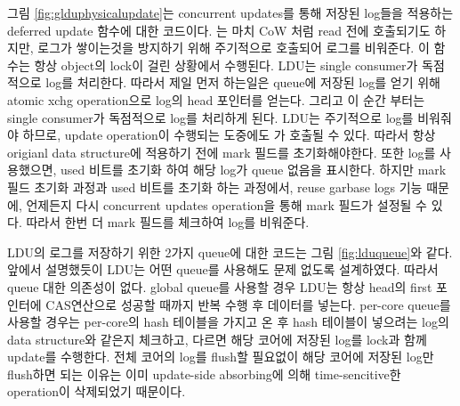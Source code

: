 \ifkor
그림 \ref{fig:glduphysicalupdate}는 concurrent updates를 통해 저장된 log들을 적용하는 deferred
update 함수에 대한 코드이다.
는 마치 CoW 처럼 read 전에 호출되기도 하지만, 로그가 쌓이는것을 방지하기 위해 주기적으로
호출되어 로그를 비워준다.
이 함수는 항상 object의 lock이 걸린 상황에서 수행된다. 
LDU는 single consumer가 독점적으로 log를 처리한다.
따라서 제일 먼저 하는일은 queue에 저장된 log를 얻기 위해 atomic xchg operation으로 log의 head 포인터를
얻는다.
그리고 이 순간 부터는 single consumer가 독점적으로 log를 처리하게 된다.
LDU는 주기적으로 log를 비워줘야 하므로, update operation이 수행되는 도중에도 가
호출될 수 있다.
따라서 항상 origianl data structure에 적용하기 전에 mark 필드를 초기화해야한다.
또한 log를 사용했으면, used 비트를 초기화 하여 해당 log가 queue 없음을 표시한다.
하지만 mark 필드 초기화 과정과 used 비트를 초기화 하는 과정에서, reuse garbase logs 기능 때문에,
언제든지 다시 concurrent updates operation을 통해 mark 필드가 설정될 수 있다.
따라서 한번 더 mark 필드를 체크하여 log를 비워준다.
\else

\fi


\ifkor
LDU의 로그를 저장하기 위한 2가지 queue에 대한 코드는 그림 \ref{fig:lduqueue}와 같다. 
앞에서 설명했듯이 LDU는 어떤 queue를 사용해도 문제 없도록 설계하였다.
따라서 queue 대한 의존성이 없다.
global queue를 사용할 경우 LDU는 항상 head의 first 포인터에 CAS연산으로 성공할 때까지 반복 수행 후 데이터를 넣는다. 
per-core queue를 사용할 경우는 per-core의 hash 테이블을 가지고 온 후 hash 테이블이 넣으려는 log의
data structure와 같은지 체크하고, 다르면 해당 코어에 저장된 log를 lock과 함께 update를 수행한다.
전체 코어의 log를 flush할 필요없이 해당 코어에 저장된 log만 flush하면 되는 이유는 이미 update-side absorbing에
의해 time-sencitive한 operation이 삭제되었기 때문이다.

\else

